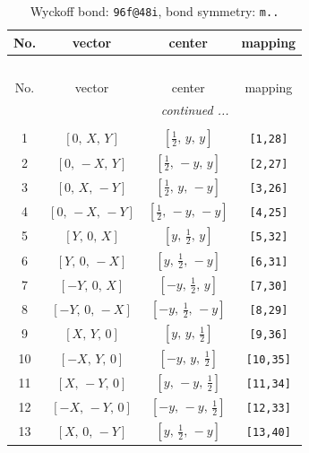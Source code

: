 \documentclass[fleqn,8pt]{jsarticle}
\begin{document}
\begin{longtable}{cccc}
\caption{Wyckoff bond: {\tt 96f@48i}, bond symmetry: {\tt m..}}
 \\
 \hline \hline
No. & vector & center & mapping \\ \hline \endfirsthead

\multicolumn{3}{l}{\tablename\ \thetable{}} \\
 \hline \hline
No. & vector & center & mapping \\ \hline \endhead

 \hline \hline
\multicolumn{3}{r}{\footnotesize\it continued ...} \\ \endfoot

 \hline \hline
\multicolumn{3}{r}{} \\ \endlastfoot

1 & $\left[ 0,\, X,\, Y \right]$ & $\left[ \frac{1}{2},\, y,\, y \right]$ & {\tt [1,28]} \\ \hline
2 & $\left[ 0,\, - X,\, Y \right]$ & $\left[ \frac{1}{2},\, - y,\, y \right]$ & {\tt [2,27]} \\ \hline
3 & $\left[ 0,\, X,\, - Y \right]$ & $\left[ \frac{1}{2},\, y,\, - y \right]$ & {\tt [3,26]} \\ \hline
4 & $\left[ 0,\, - X,\, - Y \right]$ & $\left[ \frac{1}{2},\, - y,\, - y \right]$ & {\tt [4,25]} \\ \hline
5 & $\left[ Y,\, 0,\, X \right]$ & $\left[ y,\, \frac{1}{2},\, y \right]$ & {\tt [5,32]} \\ \hline
6 & $\left[ Y,\, 0,\, - X \right]$ & $\left[ y,\, \frac{1}{2},\, - y \right]$ & {\tt [6,31]} \\ \hline
7 & $\left[ - Y,\, 0,\, X \right]$ & $\left[ - y,\, \frac{1}{2},\, y \right]$ & {\tt [7,30]} \\ \hline
8 & $\left[ - Y,\, 0,\, - X \right]$ & $\left[ - y,\, \frac{1}{2},\, - y \right]$ & {\tt [8,29]} \\ \hline
9 & $\left[ X,\, Y,\, 0 \right]$ & $\left[ y,\, y,\, \frac{1}{2} \right]$ & {\tt [9,36]} \\ \hline
10 & $\left[ - X,\, Y,\, 0 \right]$ & $\left[ - y,\, y,\, \frac{1}{2} \right]$ & {\tt [10,35]} \\ \hline
11 & $\left[ X,\, - Y,\, 0 \right]$ & $\left[ y,\, - y,\, \frac{1}{2} \right]$ & {\tt [11,34]} \\ \hline
12 & $\left[ - X,\, - Y,\, 0 \right]$ & $\left[ - y,\, - y,\, \frac{1}{2} \right]$ & {\tt [12,33]} \\ \hline
13 & $\left[ X,\, 0,\, - Y \right]$ & $\left[ y,\, \frac{1}{2},\, - y \right]$ & {\tt [13,40]} \\ \hline

\end{longtable}
\end{document}
